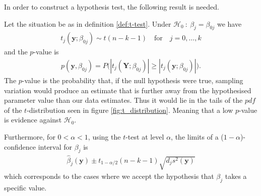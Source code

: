 In order to construct a hypothesis test, the following result is needed.

\begin{theorem}  \label{th:t_distribution}
Let the situation be as in definition \ref{def:t-test}. Under $\mathcal{H}_0 \ : \ \beta_j=\beta_{0j}$ we have 
\begin{align}
   t_j(\textbf{y};\beta_{0j})  \sim t(n-k-1) \quad \text{for} \quad j=0,\ldots,k
\end{align}
and the $p$-value is
\begin{align}\label{eq:t_test_pvalue}
    p(\textbf{y},\beta_{0j})=P\Big(|t_j(\textbf{Y};\beta_{0j})|\geq |t_j(\textbf{y};\beta_{0j})|\Big).
\end{align}
The $p$-value is the probability that, if the null hypothesis were true, sampling variation would produce an estimate that is further away from the hypothesised parameter value than our data estimates.  
Thus it would lie in the tails of the $pdf$ of the $t$-distribution seen in figure \ref{fig:t_distribution}.
Meaning that a low $p$-value is evidence against $\mathcal{H}_0$.

Furthermore, for $0<\alpha<1$, using the $t$-test at level $\alpha$, the limits of a ($1-\alpha$)-confidence interval for $\beta_j$ is
\begin{align} \label{eq:t_statistic}
    \hat{\beta}_{j}(\textbf{y}) \pm t_{1-\alpha/2}(n-k-1)\sqrt{d_j s^2(\textbf{y})}
\end{align}
which corresponds to the cases where we accept the hypothesis that $\beta_j$ takes a specific value.
\end{theorem}
